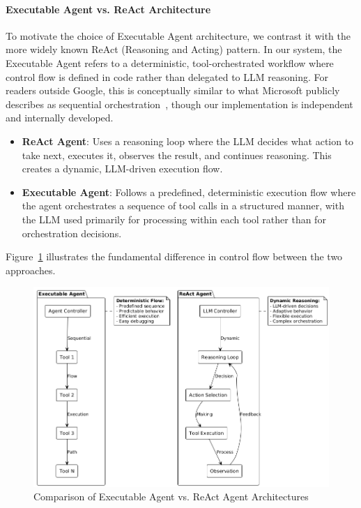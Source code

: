 \begin{spacing}{1.2}
\paragraph{Executable Agent vs. ReAct Architecture}
To motivate the choice of Executable Agent architecture, we contrast it with the more widely known ReAct (Reasoning and Acting) pattern. In our system, the Executable Agent refers to a deterministic, tool-orchestrated workflow where control flow is defined in code rather than delegated to LLM reasoning. For readers outside Google, this is conceptually similar to what Microsoft publicly describes as sequential orchestration~\cite{microsoftAgentPatterns}, though our implementation is independent and internally developed.

\begin{itemize}
    \item \textbf{ReAct Agent}: Uses a reasoning loop where the LLM decides what action to take next, executes it, observes the result, and continues reasoning. This creates a dynamic, LLM-driven execution flow.
    \item \textbf{Executable Agent}: Follows a predefined, deterministic execution flow where the agent orchestrates a sequence of tool calls in a structured manner, with the LLM used primarily for processing within each tool rather than for orchestration decisions.
\end{itemize}


Figure~\ref{fig:agent_comparison} illustrates the fundamental difference in control flow between the two approaches.

\begin{figure}[H] 
	\centering 
	\includegraphics[scale=0.6]{images/agent_architecture_comparison.png} 
	\caption{Comparison of Executable Agent vs. ReAct Agent Architectures} 
	\label{fig:agent_comparison} 
\end{figure}


\end{spacing}
